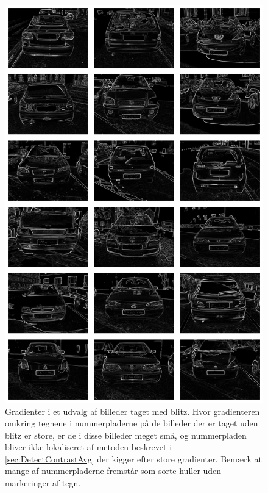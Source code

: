 \documentclass[11pt,a4paper,final]{article}
\begin{document}
\begin{figure}[htp]
\centering
\includegraphics[width=12cm]{appendix/illu/badgrads.png} 
\caption{Gradienter i et udvalg af billeder taget med blitz. Hvor gradienteren omkring tegnene i nummerpladerne på de billeder der er taget uden blitz er store, er de i disse billeder meget små, og nummerpladen bliver ikke lokaliseret af metoden beskrevet i \vref{sec:DetectContrastAvg} der kigger efter store gradienter. Bemærk at mange af nummerpladerne fremstår som sorte huller uden markeringer af tegn.}
\label{fig:illu:badgrads}
\end{figure}


\end{document}
